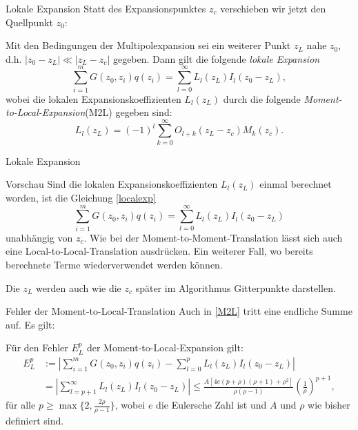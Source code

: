 \documentclass[ngerman]{beamer}
\begin{document}
\begin{frame}{Lokale Expansion}
Statt des Expansionspunktes $z_c$ verschieben wir jetzt den Quellpunkt $z_0$:
\begin{Satz}
Mit den Bedingungen der Multipolexpansion sei ein weiterer Punkt $z_L$ nahe $z_0$, d.h. $|z_0-z_L|\ll |z_L-z_c|$ gegeben. Dann gilt die folgende \emph{lokale Expansion}
\begin{equation}\label{localexp}
\sum_{i=1}^m {G(z_0,z_i)q(z_i)} = \sum_{l=0}^\infty L_l(z_L)I_l(z_0-z_L),
\end{equation}
wobei die lokalen Expansionskoeffizienten $L_l(z_L)$ durch die folgende \emph{Moment-to-Local-Expansion}(M2L) gegeben sind:
\begin{equation}\label{M2L}
L_l(z_L)=(-1)^l\sum_{k=0}^\infty O_{l+k}(z_L-z_c)M_k(z_c).
\end{equation}
\end{Satz}
\end{frame}

\begin{frame}{Lokale Expansion}
\begin{block}{Vorschau}
Sind die lokalen Expansionskoeffizienten $L_l(z_L)$ einmal berechnet worden, ist die Gleichung \eqref{localexp} 
\[\sum_{i=1}^m {G(z_0,z_i)q(z_i)} = \sum_{l=0}^\infty L_l(z_L)I_l(z_0-z_L)
\]
unabhängig von $z_c$. Wie bei der Moment-to-Moment-Translation lässt sich auch eine Local-to-Local-Translation ausdrücken. Ein weiterer Fall, wo bereits berechnete Terme wiederverwendet werden können.

Die $z_L$ werden auch wie die $z_c$ später im Algorithmus Gitterpunkte darstellen.
\end{block}
\end{frame}

\begin{frame}{Fehler der Moment-to-Local-Translation}
Auch in \eqref{M2L} tritt eine endliche Summe auf. Es gilt:
\begin{Satz}
Für den Fehler $E_L^p$ der Moment-to-Local-Expansion gilt:
\begin{align*}
E^p_L&:= \left|\sum_{i=1}^m {G(z_0,z_i)q(z_i)} - \sum_{l=0}^p L_l(z_L)I_l(z_0-z_L)\right|\\
&=\left|\sum_{l=p+1}^\infty L_l(z_L)I_l(z_0-z_L)\right| \leq \frac{A\left[4e(p+\rho)(\rho+1)+\rho^2\right]}{\rho(\rho-1)}\left(\frac{1}{\rho}\right)^{p+1},
\end{align*}
für alle $p\geq \max\{2, \frac{2\rho}{\rho-1}\}$, wobei $e$ die Eulersche Zahl ist und $A$ und $\rho$ wie bisher definiert sind.
\end{Satz}
\end{frame}
\end{document}
